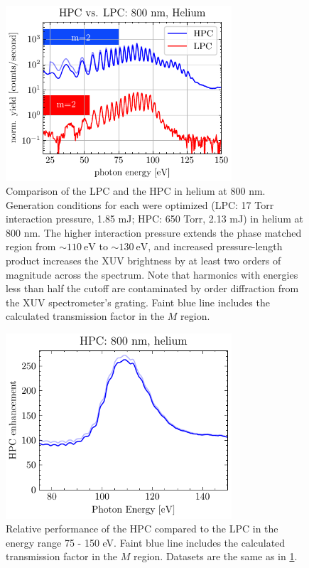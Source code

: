 \begin{figure}
	\centering
	\includegraphics[width=0.75\textwidth]{figures/chap3/HPC_vs_LPC_800He.pdf}
	\caption{Comparison of the LPC and the HPC in helium at 800 nm. Generation conditions for each were optimized (LPC: 17 Torr interaction pressure, 1.85 mJ; HPC: 650 Torr, 2.13 mJ) in helium at 800 nm. The higher interaction pressure extends the phase matched region from $ \sim 110 \ \textrm{eV}$ to $\sim 130 \ \textrm{eV}$, and increased pressure-length product increases the XUV brightness by at least two orders of magnitude across the spectrum. Note that harmonics with energies less than half the cutoff are contaminated by  order diffraction from the XUV spectrometer's grating. Faint blue line includes the calculated transmission factor in the $M$ region.}
	\label{fig:HHG-HPCvsLPCHPC}
\end{figure}

\begin{figure}
	\centering
	\includegraphics[width=0.75\textwidth]{figures/chap3/HPC_He800nm_enhancement.pdf}
	\caption{Relative performance of the HPC compared to the LPC in the energy range 75 - 150 eV. Faint blue line includes the calculated transmission factor in the $M$ region. Datasets are the same as in \cref{fig:HHG-HPCvsLPCHPC}.}
	\label{fig:HPC_He800nm_enhancement}
\end{figure}

